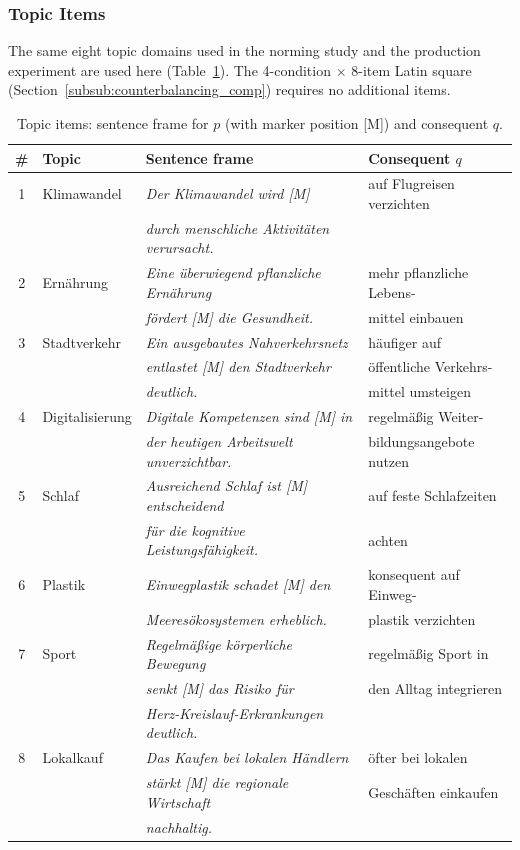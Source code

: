 \documentclass[12pt]{article}
\begin{document}
\subsubsection{Topic Items}

The same eight topic domains used in the norming study and the production
experiment are used here (Table~\ref{tab:items_comp}).
The 4-condition $\times$ 8-item Latin square (Section~\ref{subsub:counterbalancing_comp})
requires no additional items.

\begin{table}[ht]
\centering
\caption{Topic items: sentence frame for $p$ (with marker position [M])
         and consequent $q$.}
\label{tab:items_comp}
\small
\begin{tabular}{clll}
\toprule
\textbf{\#} & \textbf{Topic} & \textbf{Sentence frame} & \textbf{Consequent $q$} \\
\midrule
1 & Klimawandel &
  \textit{Der Klimawandel wird [M]} &
  auf Flugreisen verzichten \\
  & & \textit{durch menschliche Aktivit\"aten verursacht.} & \\[3pt]
2 & Ern\"ahrung &
  \textit{Eine \"uberwiegend pflanzliche Ern\"ahrung} &
  mehr pflanzliche Lebens- \\
  & & \textit{f\"ordert [M] die Gesundheit.} &
  mittel einbauen \\[3pt]
3 & Stadtverkehr &
  \textit{Ein ausgebautes Nahverkehrsnetz} &
  h\"aufiger auf \\
  & & \textit{entlastet [M] den Stadtverkehr} &
  \"offentliche Verkehrs- \\
  & & \textit{deutlich.} &
  mittel umsteigen \\[3pt]
4 & Digitalisierung &
  \textit{Digitale Kompetenzen sind [M] in} &
  regelm\"a\ss{}ig Weiter- \\
  & & \textit{der heutigen Arbeitswelt unverzichtbar.} &
  bildungsangebote nutzen \\[3pt]
5 & Schlaf &
  \textit{Ausreichend Schlaf ist [M] entscheidend} &
  auf feste Schlafzeiten \\
  & & \textit{f\"ur die kognitive Leistungsf\"ahigkeit.} &
  achten \\[3pt]
6 & Plastik &
  \textit{Einwegplastik schadet [M] den} &
  konsequent auf Einweg- \\
  & & \textit{Meeres\"okosystemen erheblich.} &
  plastik verzichten \\[3pt]
7 & Sport &
  \textit{Regelm\"a\ss{}ige k\"orperliche Bewegung} &
  regelm\"a\ss{}ig Sport in \\
  & & \textit{senkt [M] das Risiko f\"ur} &
  den Alltag integrieren \\
  & & \textit{Herz-Kreislauf-Erkrankungen deutlich.} & \\[3pt]
8 & Lokalkauf &
  \textit{Das Kaufen bei lokalen H\"andlern} &
  \"ofter bei lokalen \\
  & & \textit{st\"arkt [M] die regionale Wirtschaft} &
  Gesch\"aften einkaufen \\
  & & \textit{nachhaltig.} & \\
\bottomrule
\end{tabular}
\end{table}
\end{document}
